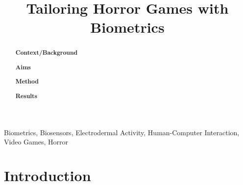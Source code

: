 \documentclass[12pt,a4paper]{article}\usepackage[]{graphicx}\usepackage[]{color}
\title{Tailoring Horror Games with Biometrics}
\author{} %
\date{}
\begin{document}
\maketitle

\begin{abstract}


\textbf{Context/Background}

\textbf{Aims}

\textbf{Method}

\textbf{Results}


\end{abstract}

\begin{keywords}
Biometrics, Biosensors, Electrodermal Activity, Human-Computer Interaction, Video Games, Horror
\end{keywords}


\section{Introduction}

\end{document}
